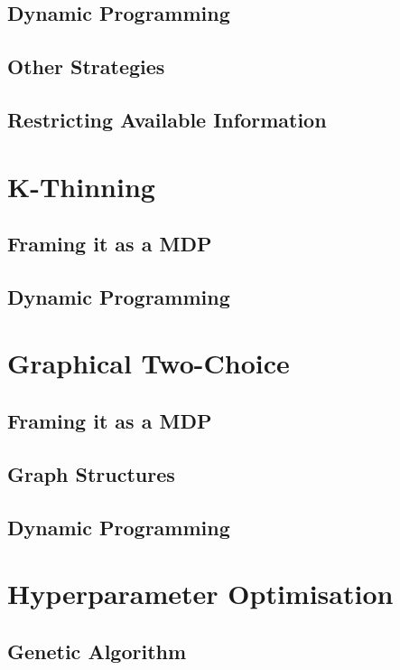 \subsection{Dynamic Programming}


\subsection{Other Strategies}


\subsection{Restricting Available Information}


\section{K-Thinning}


\subsection{Framing it as a MDP}


\subsection{Dynamic Programming}


\section{Graphical Two-Choice}


\subsection{Framing it as a MDP}


\subsection{Graph Structures}


\subsection{Dynamic Programming}


\section{Hyperparameter Optimisation}


\subsection{Genetic Algorithm}


